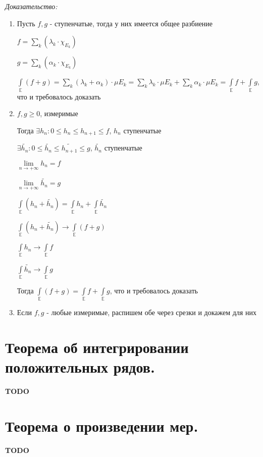 \documentclass[paper=a4, fontsize=13.2pt]{article}
\begin{document}
\emph{Доказательство:}

\begin{enumerate}
	\item Пусть $f, g$ - ступенчатые, тогда у них имеется общее разбиение

	$f = \sum\limits_{k}(\lambda_k \cdot \chi_{E_k})$

	$g = \sum\limits_{k}(\alpha_k \cdot \chi_{E_k})$

	$\int\limits_{\mathds{E}} (f + g) = \sum\limits_k (\lambda_k + \alpha_k) \cdot \mu E_k = \sum\limits_k \lambda_k \cdot \mu E_k + \sum\limits_k \alpha_k \cdot \mu E_k = \int\limits_{\mathds{E}} f + \int\limits_{\mathds{E}} g$, что и требовалось доказать

	\item $f, g \geqslant 0$, измеримые

	Тогда $\exists h_n: 0 \leqslant h_n \leqslant h_{n + 1} \leqslant f$, $h_n$ ступенчатые

	$\exists \widetilde{h_n}: 0 \leqslant \widetilde{h_n} \leqslant \widetilde{h_{n + 1}} \leqslant g$, $\widetilde{h_n}$ ступенчатые

	$\lim\limits_{n \rightarrow +\infty} h_n = f$

	$\lim\limits_{n \rightarrow +\infty} \widetilde{h_n} = g$

	$\int\limits_{\mathds{E}} (h_n + \widetilde{h_n}) = \int\limits_{\mathds{E}} h_n + \int\limits_{\mathds{E}} \widetilde{h_n}$

	$\int\limits_{\mathds{E}} (h_n + \widetilde{h_n}) \rightarrow \int\limits_{\mathds{E}} (f + g)$

	$\int\limits_{\mathds{E}} h_n \rightarrow \int\limits_{\mathds{E}} f$

	$\int\limits_{\mathds{E}} \widetilde{h_n} \rightarrow \int\limits_{\mathds{E}} g$

	Тогда $\int\limits_{\mathds{E}} (f + g) = \int\limits_{\mathds{E}} f + \int\limits_{\mathds{E}} g$, что и требовалось доказать

	\item
	Если $f, g$ - любые измеримые, распишем обе через срезки и докажем для них
\end{enumerate}

\section{Теорема об интегрировании положительных рядов.}
\textbf{TODO}
\section{Теорема о произведении мер.}
\textbf{TODO}
\end{document}
